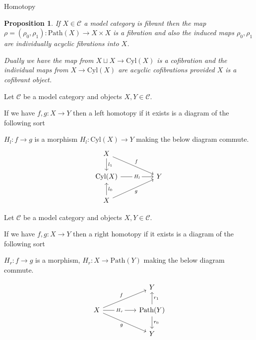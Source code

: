 \documentclass[10pt]{beamer}
\newcounter{dummy} \numberwithin{dummy}{section}
\newtheorem{proposition}[dummy]{Proposition}
\begin{document}
\begin{frame}{Homotopy}
\begin{example}
	\end{example}
	
	\begin{proposition}\label{prop-fib-acycfib}
		If $X \in \mathcal{C}$ a model category is fibrant then the map $\rho=(\rho_0, \rho_1): \mathrm{Path}(X) \to X \times X$ is a fibration and also the induced maps  $\rho_0, \rho_1$ are individually acyclic fibrations into $X$.
		
		Dually we have the map from $X \sqcup X \to \mathrm{Cyl}(X)$ is a cofibration and the individual maps from $X \to \mathrm{Cyl}(X)$ are acyclic cofibrations provided $X$ is a cofibrant object.
	\end{proposition}
	
		\begin{definition}
		Let $\mathcal{C}$ be a model category and objects $X,Y \in \mathcal{C}$.
		
		If we have \( f, g: X \to Y \) then a left homotopy if it exists is a diagram of the following sort 
		
		\( H_l: f \rightarrow g \) is a morphism \( H_l: \mathrm{Cyl}(X) \to Y \) making the below diagram commute.
		\[\begin{tikzcd}
			X \\
			{\mathrm{Cyl}(X)} && Y \\
			X
			\arrow["{l_1}", from=1-1, to=2-1]
			\arrow["f", from=1-1, to=2-3]
			\arrow["{H_l}"{description}, from=2-1, to=2-3]
			\arrow["{l_0}"', from=3-1, to=2-1]
			\arrow["g"', from=3-1, to=2-3]
		\end{tikzcd}\]
		
	\end{definition}
	\begin{definition}
		Let $\mathcal{C}$ be a model category and objects $X,Y \in \mathcal{C}$.
		
		If we have \( f, g: X \to Y \) then a right homotopy if it exists is a diagram of the following sort 
		
		\( H_r: f \rightarrow g \) is a morphism, \( H_r: X \to \mathrm{Path}(Y) \) making the below diagram commute.
		
		\[\begin{tikzcd}
			&& Y \\
			X && {\mathrm{Path}(Y)} \\
			&& Y
			\arrow["{r_1}"', from=2-3, to=1-3]
			\arrow["f", from=2-1, to=1-3]
			\arrow["{H_r}"{description}, from=2-1, to=2-3]
			\arrow["g"', from=2-1, to=3-3]
			\arrow["{r_0}", from=2-3, to=3-3]
		\end{tikzcd}\]
	\end{definition}
	

\end{frame}
\end{document}
